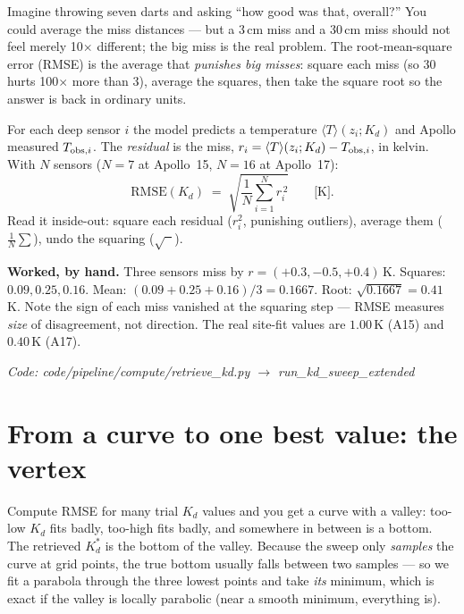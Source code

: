 \documentclass[11pt]{report}
\newcommand{\Tm}{\langle T\rangle}
\newcommand{\code}[1]{{\ttfamily\small #1}}
\begin{document}
\begin{plain}
Imagine throwing seven darts and asking ``how good was that, overall?'' You
could average the miss distances --- but a 3\,cm miss and a 30\,cm miss should
not feel merely 10$\times$ different; the big miss is the real problem. The
root-mean-square error (RMSE) is the average that \emph{punishes big misses}:
square each miss (so 30 hurts 100$\times$ more than 3), average the squares,
then take the square root so the answer is back in ordinary units.
\end{plain}

For each deep sensor $i$ the model predicts a temperature
$\Tm(z_i; K_d)$ and Apollo measured $T_{{\rm obs},i}$. The \emph{residual} is
the miss, $r_i = \Tm(z_i;K_d) - T_{{\rm obs},i}$, in kelvin. With $N$ sensors
($N{=}7$ at Apollo~15, $N{=}16$ at Apollo~17):
\[
\mathrm{RMSE}(K_d) \;=\; \sqrt{\frac{1}{N}\sum_{i=1}^{N} r_i^{\,2}}
\qquad\text{[K].}
\]
Read it inside-out: square each residual ($r_i^2$, punishing outliers), average
them ($\frac{1}{N}\sum$), undo the squaring ($\sqrt{\phantom{x}}$).

\medskip
\noindent\textbf{Worked, by hand.} Three sensors miss by $r = (+0.3, -0.5,
+0.4)$\,K. Squares: $0.09, 0.25, 0.16$. Mean: $(0.09{+}0.25{+}0.16)/3 =
0.1667$. Root: $\sqrt{0.1667} = 0.41$\,K. Note the sign of each miss vanished
at the squaring step --- RMSE measures \emph{size} of disagreement, not
direction. The real site-fit values are $1.00$\,K (A15) and $0.40$\,K (A17).

{\small\color{dim}\textit{Code: \code{code/pipeline/compute/retrieve\_kd.py}
$\to$ \code{run\_kd\_sweep\_extended}}}

\section{From a curve to one best value: the vertex}\label{sec:vertexzero}

\begin{plain}
Compute RMSE for many trial $K_d$ values and you get a curve with a valley:
too-low $K_d$ fits badly, too-high fits badly, and somewhere in between is a
bottom. The retrieved $K_d^{*}$ is the bottom of the valley. Because the sweep
only \emph{samples} the curve at grid points, the true bottom usually falls
between two samples --- so we fit a parabola through the three lowest points
and take \emph{its} minimum, which is exact if the valley is locally
parabolic (near a smooth minimum, everything is).
\end{plain}
\end{document}
